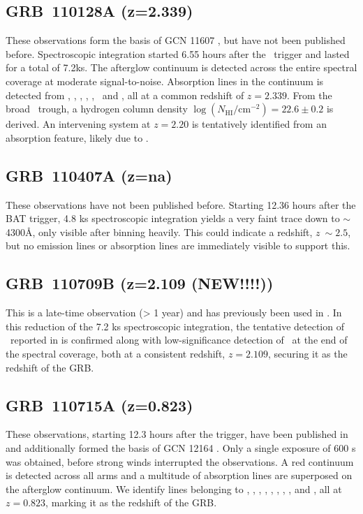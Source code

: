 \documentclass{aa}    %
\begin{document}
\subsection{GRB~110128A (z=2.339)} \label{110128}

These observations form the basis of GCN 11607 \citep{GCN11607}, but have not
been published before. Spectroscopic integration started 6.55 hours after the
\swift~trigger and lasted for a total of 7.2ks. The afterglow continuum is
detected across the entire spectral coverage at moderate signal-to-noise.
Absorption lines in the continuum is detected from \lya, \oi, \cii, \SIiv, \civ,
\SIii~and \feii, all at a common redshift of $z=2.339$. From the broad
\lya~trough, a hydrogen column density $\log (N_{\mathrm{HI}}/\mathrm{cm}^{-2})
= 22.6 \pm 0.2$ is derived. An intervening system at $z=2.20$ is tentatively
identified from an absorption feature, likely due to \civ.

\subsection{GRB~110407A (z=na)} \label{110407}

These observations have not been published before. Starting 12.36 hours after
the BAT trigger, 4.8 ks spectroscopic integration yields a very faint trace down
to $\sim$4300\AA, only visible after binning heavily. This could indicate a
redshift, $z ~\sim 2.5$, but no emission lines or absorption lines are
immediately visible to support this.

\subsection{GRB~110709B (z=2.109 (NEW!!!!))} \label{110709}

This is a late-time observation (> 1 year) and has previously been used in
\citet{Perley2016a}. In this reduction of the 7.2 ks spectroscopic integration,
the tentative detection of \oiii~reported in \citet{Perley2016a} is confirmed
along with low-significance detection of \ha~at the end of the spectral
coverage, both at a consistent redshift, $z=2.109$, securing it as the redshift
of the GRB.


\subsection{GRB~110715A (z=0.823)} \label{110715}

These observations, starting 12.3 hours after the trigger, have been published
in \citet{Sanchez-Ramirez2017} and additionally formed the basis of GCN 12164
\citep{GCN12164}. Only a single exposure of 600 s was obtained, before strong
winds interrupted the observations. A red continuum is detected across all arms
and a multitude of absorption lines are superposed on the afterglow continuum.
We identify lines belonging to \alii, \aliii, \znii, \crii, \feii, \mgii, \mgi,
\caii, and \caii, all at  $z=0.823$, marking it as the redshift of the GRB.
\end{document}

